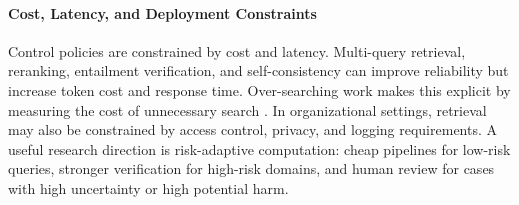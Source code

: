 \paragraph{Cost, Latency, and Deployment Constraints}

Control policies are constrained by cost and latency. Multi-query retrieval, reranking, entailment verification, and self-consistency can improve reliability but increase token cost and response time. Over-searching work makes this explicit by measuring the cost of unnecessary search \citep{rrag006}. In organizational settings, retrieval may also be constrained by access control, privacy, and logging requirements. A useful research direction is risk-adaptive computation: cheap pipelines for low-risk queries, stronger verification for high-risk domains, and human review for cases with high uncertainty or high potential harm.
